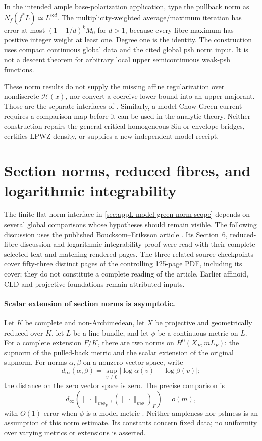 In the intended ample base-polarization application, type the
pullback norm as \(N_f(f^*L)\simeq L^{\otimes d}\).
The multiplicity-weighted average/maximum iteration has error
at most \((1-1/d)^kM_0\) for \(d>1\), because every fibre maximum
has positive integer weight at least one. Degree one is the
identity. The construction uses compact continuous global data
and the cited global psh norm input. It is not a descent theorem
for arbitrary local upper semicontinuous weak-psh functions.

These norm results do not supply the missing affine regularization
over nondiscrete \(\mathcal H(x)\), nor convert a coercive lower
bound into an upper majorant. Those are the separate interfaces of
. Similarly, a model-Chow
Green current requires a comparison map before it can be used in
the analytic theory. Neither construction repairs the general
critical homogeneous Siu or envelope bridges, certifies LPWZ
density, or supplies a new independent-model receipt.

\section{Section norms, reduced fibres, and logarithmic integrability}
\label{sec:appL-supnorm-reduced-fibre-log-scope}

The finite flat norm interface in
\cref{sec:appL-model-green-norm-scope} depends on several global
comparisons whose hypotheses should remain visible.
The following discussion uses the published Boucksom--Eriksson
article \cite{BE21}.  Its Section~6, reduced-fibre discussion and
logarithmic-integrability proof were read with their complete
selected text and matching rendered pages.
The three related source checkpoints cover fifty-three distinct
pages of the controlling 125-page PDF, including its cover;
they do not constitute a complete reading of the article.
Earlier affinoid, CLD and projective foundations remain attributed
inputs.

\paragraph{Scalar extension of section norms is asymptotic.}
Let \(K\) be complete and non-Archimedean, let \(X\) be projective
and geometrically reduced over \(K\), let \(L\) be a line bundle,
and let \(\phi\) be a continuous metric on \(L\).
For a complete extension \(F/K\), there are two norms on
\(H^0(X_F,mL_F)\): the supnorm of the pulled-back metric and
the scalar extension of the original supnorm.
For norms \(\alpha,\beta\) on a nonzero vector space, write
\[
 d_\infty(\alpha,\beta)
   =\sup_{v\ne0}\bigl|\log\alpha(v)-\log\beta(v)\bigr|;
\]
the distance on the zero vector space is zero.
The precise comparison is
\[
 d_\infty\!\left(\|\cdot\|_{m\phi_F},
                    (\|\cdot\|_{m\phi})_F\right)=o(m),
\]
with \(O(1)\) error when \(\phi\) is a model metric
\cite[Theorem~6.6]{BE21}.
Neither ampleness nor pshness is an assumption of this norm estimate.
Its constants concern fixed data; no uniformity over varying metrics
or extensions is asserted.

